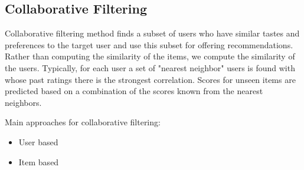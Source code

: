\subsection{Collaborative Filtering}
 Collaborative filtering method finds a subset of users who have similar tastes and preferences to the target user and use this subset for offering recommendations. Rather than computing the similarity of the items, we compute the similarity of the users. Typically, for each user a set of "nearest neighbor" users is found with whose past ratings there is the strongest correlation. Scores for unseen items are predicted based on a combination of the scores known from the nearest neighbors.

Main approaches for collaborative filtering:
\begin{itemize}
\item User based
\end{itemize}
\begin{itemize}
\item Item based
\end{itemize}

